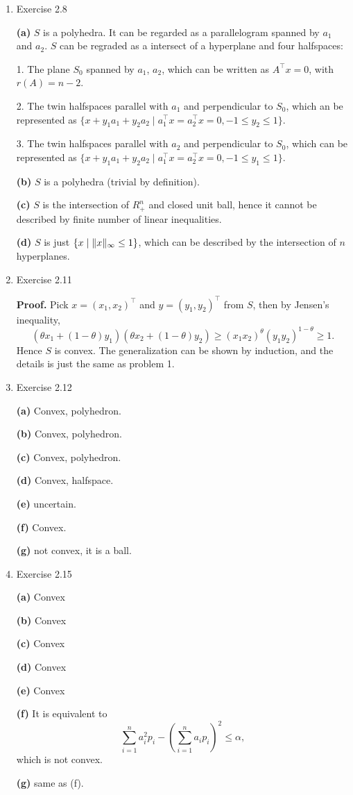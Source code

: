 \documentclass{article}%
\begin{document}
\begin{enumerate}
\item Exercise 2.8

\textbf{(a)} $S$ is a polyhedra. It can be regarded as a parallelogram spanned by $a_1 $ and $a_2 $. $S$ can be regraded as a intersect of a hyperplane and four halfspaces:

1. The plane $S_0 $ spanned by $a_1 $, $a_2 $, which can be written as $A^\top x = 0 $, with $r(A) = n-2$.

2. The twin halfspaces parallel with $a_1 $ and perpendicular to $S_0 $, which an be represented as $\{x+y_1a_1+y_2a_2\mid a_1^\top x = a_2^\top x = 0, -1\le y_2 \le 1\}$.

3. The twin halfspaces parallel with $a_2 $ and perpendicular to $S_0 $, which can be represented as $\{x+y_1a_1+y_2a_2\mid a_1^\top x = a_2^\top x = 0, -1\le y_1 \le 1\}$.

\textbf{(b)} $S$ is a polyhedra (trivial by definition).

\textbf{(c)} $S$ is the intersection of $R_{+}^{n} $ and closed unit ball, hence it cannot be described by finite number of linear inequalities.

\textbf{(d)} $S$ is just $\{x\mid \lVert x \rVert_{\infty} \le 1 \}$, which can be described by the intersection of $n$ hyperplanes.

\item Exercise 2.11

\textbf{Proof.} Pick $x = (x_1, x_2)^\top $ and $y = (y_1, y_2)^\top $ from $S$, then by Jensen's inequality,
$$
(\theta x_1+(1-\theta)y_1)(\theta x_2+(1-\theta)y_2) \ge (x_1x_2)^\theta(y_1y_2)^{1-\theta} \ge 1.
$$
Hence $S$ is convex. The generalization can be shown by induction, and the details is just the same as problem 1.

\item Exercise 2.12

\textbf{(a)} Convex, polyhedron.

\textbf{(b)} Convex, polyhedron.

\textbf{(c)} Convex, polyhedron.

\textbf{(d)} Convex, halfspace.

\textbf{(e)} uncertain. 

\textbf{(f)} Convex.

\textbf{(g)} not convex, it is a ball.

\item Exercise 2.15

\textbf{(a)} Convex

\textbf{(b)} Convex

\textbf{(c)} Convex

\textbf{(d)} Convex

\textbf{(e)} Convex

\textbf{(f)} It is equivalent to
$$
\sum_{i=1}^{n}a_i^2p_i - \left(\sum_{i=1}^{n}a_ip_i\right)^2 \le \alpha, 
$$
which is not convex. 

\textbf{(g)} same as (f).

\end{enumerate}
\end{document}
